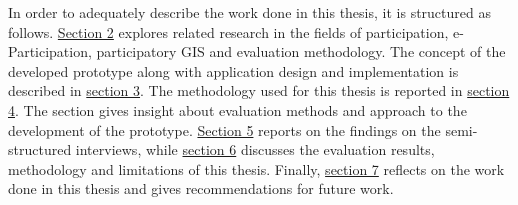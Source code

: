 In order to adequately describe the work done in this thesis, it is structured as follows. \hyperref[chap:related_work]{Section 2} explores related research in the fields of participation, e-Participation, participatory GIS and evaluation methodology. The concept of the developed prototype along with application design and implementation is described in \hyperref[chap:approach]{section 3}. The methodology used for this thesis is reported in \hyperref[chap:methodology]{section 4}. The section gives insight about evaluation methods and approach to the development of the prototype. \hyperref[chap:methodology]{Section 5} reports on the findings on the semi-structured interviews, while \hyperref[chap:discussion]{section 6} discusses the evaluation results, methodology and limitations of this thesis. Finally, \hyperref[chap:conclusion]{section 7} reflects on the work done in this thesis and gives recommendations for future work.




